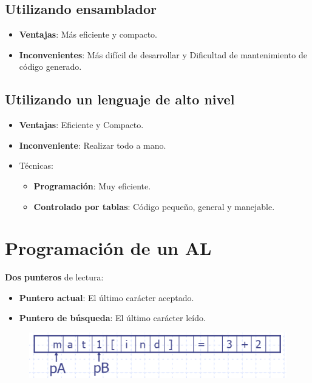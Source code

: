 \documentclass[12pt, twoside, openright]{report} %
\begin{document}
\subsection{Utilizando ensamblador}

\begin{itemize}

\item
  \textbf{Ventajas}: Más eficiente y compacto.
\item
  \textbf{Inconvenientes}: Más difícil de desarrollar y Dificultad de
  mantenimiento de código generado.
\end{itemize}


\subsection{Utilizando un lenguaje de alto nivel}

\begin{itemize}
\item
  \textbf{Ventajas}: Eficiente y Compacto.
\item
  \textbf{Inconveniente}: Realizar todo a mano.
\item
  Técnicas:

  \begin{itemize}
  \item \textbf{Programación}: Muy eficiente.    
  \item \textbf{Controlado por tablas}: Código pequeño, general y
    manejable.
  \end{itemize}
\end{itemize}


\section{Programación de un AL}

\textbf{Dos punteros} de lectura:

\begin{itemize}
\item
  \textbf{Puntero actual}: El último carácter aceptado.
\item
  \textbf{Puntero de búsqueda}: El último carácter leído.
\end{itemize}

\begin{figure}[H]
	{\includegraphics[scale=.3]{Untitled 33.png}}
\end{figure}
\end{document}
